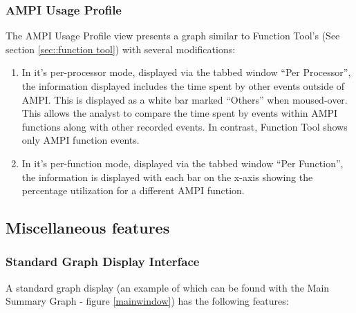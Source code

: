 \documentclass[10pt]{article}
\begin{document}

\subsubsection{AMPI Usage Profile}

The AMPI Usage Profile view presents a graph similar to Function
Tool's (See section \ref{sec::function tool}) with several
modifications:

\begin{enumerate}
\item In it's per-processor mode, displayed via the tabbed window
``Per Processor'', the information displayed includes the time spent
by other events outside of AMPI. This is displayed as a white bar
marked ``Others'' when moused-over. This allows the analyst to compare
the time spent by events within AMPI functions along with other
recorded events. In contrast, Function Tool shows only AMPI function
events.
\item In it's per-function mode, displayed via the tabbed window ``Per
Function'', the information is displayed with each bar on the x-axis
showing the percentage utilization for a different AMPI function.
\end{enumerate}



\subsection{Miscellaneous features}
\label{sec::misc}

\subsubsection{Standard Graph Display Interface} 

A standard graph display (an example of which can be found with the
Main Summary Graph - figure \ref{mainwindow}) has the following
features:
\end{document}
